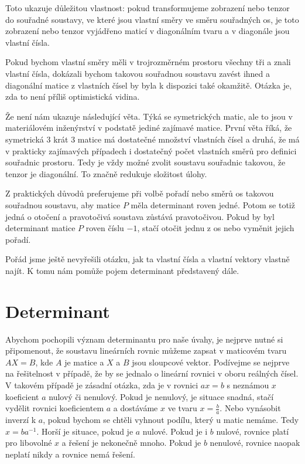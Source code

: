 \documentclass[12pt]{article}
\begin{document}
Toto ukazuje důležitou vlastnost: pokud transformujeme zobrazení nebo tenzor do souřadné soustavy, ve které jsou vlastní směry ve směru souřadných os, je toto zobrazení nebo tenzor vyjádřeno maticí v diagonálním tvaru a v diagonále jsou vlastní čísla.

Pokud bychom vlastní směry měli v trojrozměrném prostoru všechny tři a znali vlastní čísla, dokázali bychom takovou souřadnou soustavu zavést ihned a diagonální matice z vlastních čísel by byla k dispozici také okamžitě. Otázka je, zda to není příliš optimistická vidina.

Že není nám ukazuje následující věta. Týká se symetrických matic, ale to jsou v materiálovém inženýrství v podstatě jediné zajímavé matice.  První věta říká, že symetrická 3 krát 3 matice má dostatečné množství vlastních čísel a druhá, že má v prakticky zajímavých případech i dostatečný počet vlastních směrů pro definici souřadnic prostoru. Tedy je vždy možné zvolit soustavu souřadnic takovou, že tenzor je diagonální. To značně redukuje složitost úlohy.

Z praktických důvodů preferujeme při volbě pořadí nebo směrů os takovou souřadnou soustavu, aby matice $P$ měla determinant roven jedné. Potom se totiž jedná o otočení a pravotočivá soustava zůstává pravotočivou. Pokud by byl determinant matice $P$ roven číslu $-1$, stačí otočit jednu z os nebo vyměnit jejich pořadí. 

Pořád jsme ještě nevyřešili otázku, jak ta vlastní čísla a vlastní vektory vlastně najít. K tomu nám pomůže pojem determinant představený dále.

\section{Determinant}

Abychom pochopili význam determinantu pro naše úvahy, je nejprve nutné si připomenout, že soustavu lineárních rovnic můžeme zapsat v maticovém tvaru $AX=B$, kde $A$ je matice a $X$ a $B$ jsou sloupcové vektor. Podívejme se nejprve na řešitelnost v případě, že by se jednalo o lineární rovnici v oboru reálných čísel. V takovém  případě je zásadní otázka, zda je v rovnici $ax=b$ s neznámou $x$ koeficient $a$ nulový či nenulový. Pokud je nenulový, je situace snadná, stačí vydělit rovnici koeficientem $a$ a dostáváme $x$ ve tvaru $x=\frac ba$. Nebo vynásobit inverzí k $a$, pokud bychom se chtěli vyhnout podílu, který u matic nemáme. Tedy $x=b a^{-1}.$ Horší je situace, pokud je $a$ nulové. Pokud je i $b$ nulové, rovnice platí pro libovolné $x$ a řešení je nekonečně mnoho. Pokud je $b$ nenulové, rovnice naopak neplatí nikdy a rovnice nemá řešení.
\end{document}
